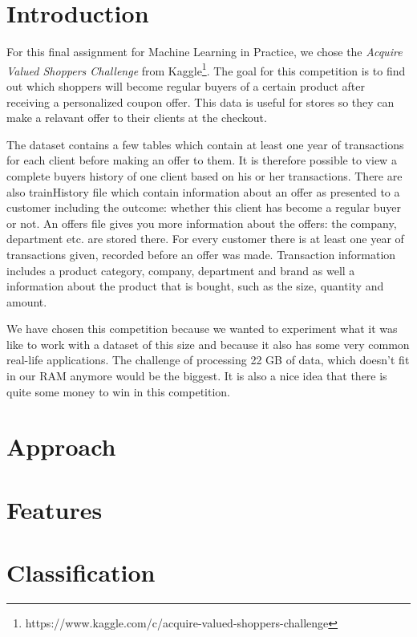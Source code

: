 \documentclass[a4paper]{article}
\begin{document}
\newpage

\section{Introduction}
For this final assignment for Machine Learning in Practice, we chose the \emph{Acquire Valued Shoppers Challenge} from Kaggle\footnote{https://www.kaggle.com/c/acquire-valued-shoppers-challenge}. The goal for this competition is to find out which shoppers will become regular buyers of a certain product after receiving a personalized coupon offer. This data is useful for stores so they can make a relavant offer to their clients at the checkout.

The dataset contains a few tables which contain at least one year of transactions for each client before making an offer to them. It is therefore possible to view a complete buyers history of one client based on his or her transactions. There are also trainHistory file which contain information about an offer as presented to a customer including the outcome: whether this client has become a regular buyer or not. An offers file gives you more information about the offers: the company, department etc. are stored there. For every customer there is at least one year of transactions given, recorded before an offer was made. Transaction information includes a product category, company, department and brand as well a information about the product that is bought, such as the size, quantity and amount.

We have chosen this competition because we wanted to experiment what it was like to work with a dataset of this size and because it also has some very common real-life applications. The challenge of processing 22 GB of data, which doesn't fit in our RAM anymore would be the biggest. It is also a nice idea that there is quite some money to win in this competition.

\section{Approach}


\section{Features}


\section{Classification}
\end{document}
